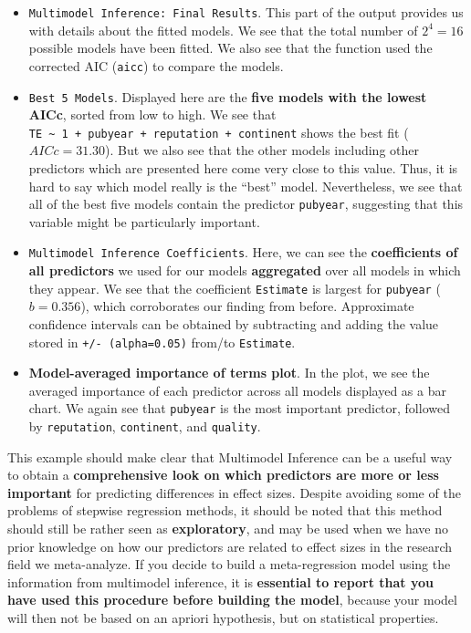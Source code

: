 \documentclass[]{book}
\providecommand{\tightlist}{%
  \setlength{\itemsep}{0pt}\setlength{\parskip}{0pt}}
\begin{document}
\begin{itemize}
\tightlist
\item
  \texttt{Multimodel\ Inference:\ Final\ Results}. This part of the output provides us with details about the fitted models. We see that the total number of \(2^4=16\) possible models have been fitted. We also see that the function used the corrected AIC (\texttt{aicc}) to compare the models.
\item
  \texttt{Best\ 5\ Models}. Displayed here are the \textbf{five models with the lowest AICc}, sorted from low to high. We see that \texttt{TE\ \textasciitilde{}\ 1\ +\ pubyear\ +\ reputation\ +\ continent} shows the best fit (\(AICc=31.30\)). But we also see that the other models including other predictors which are presented here come very close to this value. Thus, it is hard to say which model really is the ``best'' model. Nevertheless, we see that all of the best five models contain the predictor \texttt{pubyear}, suggesting that this variable might be particularly important.
\item
  \texttt{Multimodel\ Inference\ Coefficients}. Here, we can see the \textbf{coefficients of all predictors} we used for our models \textbf{aggregated} over all models in which they appear. We see that the coefficient \texttt{Estimate} is largest for \texttt{pubyear} (\(b=0.356\)), which corroborates our finding from before. Approximate confidence intervals can be obtained by subtracting and adding the value stored in \texttt{+/-\ (alpha=0.05)} from/to \texttt{Estimate}.
\item
  \textbf{Model-averaged importance of terms plot}. In the plot, we see the averaged importance of each predictor across all models displayed as a bar chart. We again see that \texttt{pubyear} is the most important predictor, followed by \texttt{reputation}, \texttt{continent}, and \texttt{quality}.
\end{itemize}

\begin{rmdinfo}
This example should make clear that Multimodel Inference can be a useful
way to obtain a \textbf{comprehensive look on which predictors are more
or less important} for predicting differences in effect sizes. Despite
avoiding some of the problems of stepwise regression methods, it should
be noted that this method should still be rather seen as
\textbf{exploratory}, and may be used when we have no prior knowledge on
how our predictors are related to effect sizes in the research field we
meta-analyze. If you decide to build a meta-regression model using the
information from multimodel inference, it is \textbf{essential to report
that you have used this procedure before building the model}, because
your model will then not be based on an apriori hypothesis, but on
statistical properties.
\end{rmdinfo}
\end{document}
